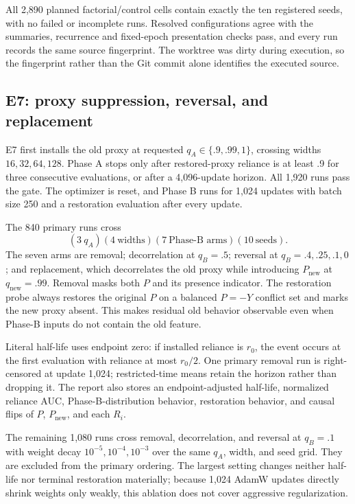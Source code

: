 \documentclass[11pt,a4paper]{article}
\begin{document}
All 2,890 planned factorial/control cells contain exactly the ten registered seeds, with no failed or incomplete runs. Resolved configurations agree with the summaries, recurrence and fixed-epoch presentation checks pass, and every run records the same source fingerprint. The worktree was dirty during execution, so the fingerprint rather than the Git commit alone identifies the executed source.

\subsection{E7: proxy suppression, reversal, and replacement}

E7 first installs the old proxy at requested $q_A\in\{.9,.99,1\}$, crossing widths $16,32,64,128$. Phase A stops only after restored-proxy reliance is at least .9 for three consecutive evaluations, or after a 4,096-update horizon. All 1,920 runs pass the gate. The optimizer is reset, and Phase B runs for 1,024 updates with batch size 250 and a restoration evaluation after every update.

The 840 primary runs cross
\[
(3\ q_A)(4\ \text{widths})(7\ \text{Phase-B arms})(10\ \text{seeds}).
\]
The seven arms are removal; decorrelation at $q_B=.5$; reversal at $q_B=.4,.25,.1,0$; and replacement, which decorrelates the old proxy while introducing $P_{\mathrm{new}}$ at $q_{\mathrm{new}}=.99$. Removal masks both $P$ and its presence indicator. The restoration probe always restores the original $P$ on a balanced $P=-Y$ conflict set and marks the new proxy absent. This makes residual old behavior observable even when Phase-B inputs do not contain the old feature.

Literal half-life uses endpoint zero: if installed reliance is $r_0$, the event occurs at the first evaluation with reliance at most $r_0/2$. One primary removal run is right-censored at update 1,024; restricted-time means retain the horizon rather than dropping it. The report also stores an endpoint-adjusted half-life, normalized reliance AUC, Phase-B-distribution behavior, restoration behavior, and causal flips of $P$, $P_{\mathrm{new}}$, and each $R_i$.

The remaining 1,080 runs cross removal, decorrelation, and reversal at $q_B=.1$ with weight decay $10^{-5},10^{-4},10^{-3}$ over the same $q_A$, width, and seed grid. They are excluded from the primary ordering. The largest setting changes neither half-life nor terminal restoration materially; because 1,024 AdamW updates directly shrink weights only weakly, this ablation does not cover aggressive regularization.
\end{document}

